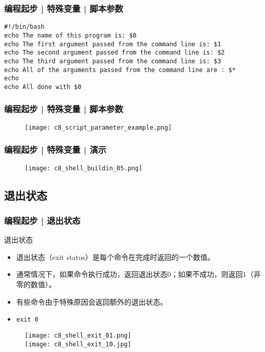 \begin{frame}[fragile]
  \frametitle{编程起步 | 特殊变量 | \alert{脚本参数}}
\begin{lstlisting}
#!/bin/bash
echo The name of this program is: $0
echo The first argument passed from the command line is: $1
echo The second argument passed from the command line is: $2
echo The third argument passed from the command line is: $3
echo All of the arguments passed from the command line are : $*
echo
echo All done with $0
\end{lstlisting}
\end{frame}

\begin{frame}
  \frametitle{编程起步 | 特殊变量 | 脚本参数}
  \begin{figure}
    \centering
    \texttt{[image: c8\_script\_parameter\_example.png]}
  \end{figure}
\end{frame}

\begin{frame}
  \frametitle{编程起步 | 特殊变量 | \alert{演示}}
  \begin{figure}
    \centering
    \texttt{[image: c8\_shell\_buildin\_05.png]}
  \end{figure}
\end{frame}

\subsection{退出状态}
\begin{frame}[fragile]
  \frametitle{编程起步 | \alert{退出状态}}
  \begin{block}{退出状态}
    \begin{itemize}
      \item 退出状态（exit status）是每个命令在完成时返回的一个数值。
      \item 通常情况下，如果命令执行成功，返回退出状态0；如果不成功，则返回1（非零的数值）。
      \item 有些命令由于特殊原因会返回额外的退出状态。
      \item \verb|exit 0|
    \end{itemize}
  \end{block}
  \vspace{-0.3cm}
  \begin{figure}
    \centering
    \texttt{[image: c8\_shell\_exit\_01.png]}\\
    \texttt{[image: c8\_shell\_exit\_10.jpg]}
  \end{figure}
\end{frame}

